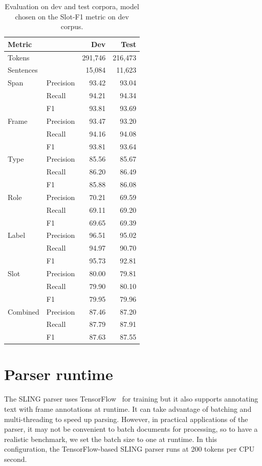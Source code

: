 \documentclass[11pt,a4paper]{article}
\begin{document}
\begin{table}[ht]
\begin{tabular}{|ll|r|r|}
\hline
{\bf Metric} & & {\bf Dev} & {\bf Test} \\
\hline
Tokens & & 291,746  & 216,473  \\
\hline
Sentences &   & 15,084 & 11,623  \\
\hline
\hline
Span & Precision & 93.42  & 93.04 \\
\hline
& Recall & 94.21 & 94.34 \\
\hline
& F1 & 93.81 & 93.69 \\
\hline
Frame & Precision & 93.47 & 93.20 \\
\hline
& Recall & 94.16 & 94.08 \\
\hline
& F1 & 93.81 & 93.64\\
\hline
Type & Precision & 85.56  & 85.67 \\
\hline
& Recall & 86.20 & 86.49 \\
\hline
& F1 & 85.88 & 86.08 \\
\hline
Role & Precision & 70.21 & 69.59 \\
\hline
& Recall & 69.11 & 69.20 \\
\hline
& F1 & 69.65 & 69.39 \\
\hline
Label & Precision & 96.51 & 95.02 \\
\hline
& Recall & 94.97 & 90.70 \\
\hline
& F1 & 95.73 & 92.81 \\
\hline
Slot & Precision & 80.00 & 79.81 \\
\hline
& Recall & 79.90 & 80.10 \\
\hline
& F1 & 79.95 & 79.96 \\
\hline
Combined & Precision & 87.46 & 87.20 \\
\hline
& Recall & 87.79 & 87.91 \\
\hline
& F1 & 87.63 & 87.55 \\
\hline
\end{tabular}
\caption{Evaluation on dev and test corpora, model
chosen on the Slot-F1 metric on dev corpus.}
\label{tab:eval}
\end{table}


\section{Parser runtime}
\label{sec:runtime}

The SLING parser uses TensorFlow~\cite{tensorflow} for training but it also
supports annotating text with frame annotations at runtime. It can take
advantage of batching and multi-threading to speed up parsing. However, in
practical applications of the parser, it may not be convenient to
batch documents for processing, so to have a realistic benchmark, we
set the batch size to one at runtime. In this configuration, the
TensorFlow-based SLING parser runs at 200 tokens per CPU second.
\end{document}
